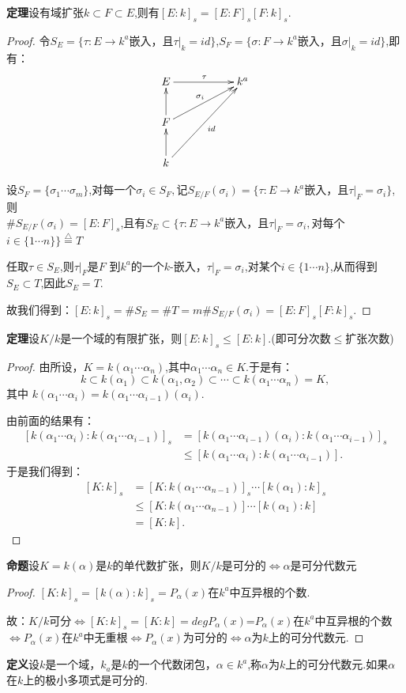 \documentclass[UTF8]{article}
\begin{document}
\textbf{定理}\quad 设有域扩张$k\subset F\subset E$,则有$[E:k]_s=[E:F]_s[F:k]_s$.
\begin{proof}
令$S_{E}=\{\tau:E\rightarrow k^a$嵌入，且$\tau|_k=id\}$,$S_{F}=\{\sigma:F\rightarrow k^a$嵌入，且$\sigma|_k=id\}$,即有：$$\xymatrix{E\ar[rr]^{\tau}&&{k^a}\\F \ar[u] \ar[rru]^{\sigma_i} && \\k \ar[u] \ar[rruu]_{id} && } $$

设$S_{F}=\{\sigma_1\cdots \sigma_m\}$,对每一个$\sigma_i\in S_F,$记$S_{E/F}(\sigma_i)=\{\tau:E\rightarrow k^a$嵌入，且$\tau|_F=\sigma_i\}$,则\\%
$\# S_{E/F}(\sigma_i)=[E:F]_s$,且有$S_E\subset \{\tau:E\rightarrow k^a$嵌入，且$\tau|_F=\sigma_i,$对每个$i\in \{1\cdots n\}\} \stackrel{\bigtriangleup}{=}T$

任取$\tau\in S_E$,则$\tau|_F$是$F$ 到$k^a$的一个$k$-嵌入，$\tau|_F=\sigma_i$,对某个$i\in \{1\cdots n\}$,从而得到$S_E\subset T$,因此$S_E=T$.

故我们得到：$[E:k]_s=\#S_E=\#T=m\#S_{E/F}(\sigma_i)=[E:F]_s[F:k]_s.$
\end{proof}

\textbf{定理}\quad 设$K/k$是一个域的有限扩张，则$[E:k]_s\le [E:k]$.(即可分次数$\le$扩张次数)
\begin{proof}
由所设，$K=k(\alpha_1\cdots\alpha_n)$,其中$\alpha_1\cdots\alpha_n\in K$.于是有：
$$k\subset k(\alpha_1)\subset k(\alpha_1,\alpha_2)\subset\cdots\subset k(\alpha_1\cdots\alpha_n)=K,$$其中 $k(\alpha_1\cdots\alpha_i)= k(\alpha_1\cdots\alpha_{i-1})(\alpha_i).$

由前面的结果有：
\[
\begin{split}
[k(\alpha_1\cdots\alpha_i):k(\alpha_1\cdots\alpha_{i-1})]_s&=[k(\alpha_1\cdots\alpha_{i-1})(\alpha_i):k(\alpha_1\cdots\alpha_{i-1})]_s\\
&\le[k(\alpha_1\cdots\alpha_i):k(\alpha_1\cdots\alpha_{i-1})].
\end{split}
\]
于是我们得到：
\[
\begin{split}
[K:k]_s&=[K: k(\alpha_1\cdots\alpha_{n-1})]_s\cdots[k(\alpha_1):k]_s\\
&\le[K: k(\alpha_1\cdots\alpha_{n-1})]\cdots[k(\alpha_1):k]\\
&=[K:k].
\end{split}
\]
\end{proof}

\textbf{命题}\quad 设$K=k(\alpha)$是$k$的单代数扩张，则$K/k$是可分的$\Longleftrightarrow \alpha$是可分代数元
\begin{proof}
$[K:k]_s=[k(\alpha):k]_s=P_{\alpha}(x)$在$k^a$中互异根的个数.

故：$K/k$可分$\Longleftrightarrow[K:k]_s=[K:k]=degP_{\alpha}(x)$=$P_{\alpha}(x)$在$k^a$中互异根的个数$\Longleftrightarrow P_{\alpha}(x)$在$k^a$中无重根$\Longleftrightarrow P_{\alpha}(x)$为可分的$\Longleftrightarrow \alpha$为$k$上的可分代数元.
\end{proof}
\textbf{定义}\quad 设$k$是一个域，$k_a$是$k$的一个代数闭包，$\alpha\in k^a$,称$\alpha$为$k$上的可分代数元.如果$\alpha$在$k$上的极小多项式是可分的.
\end{document}
